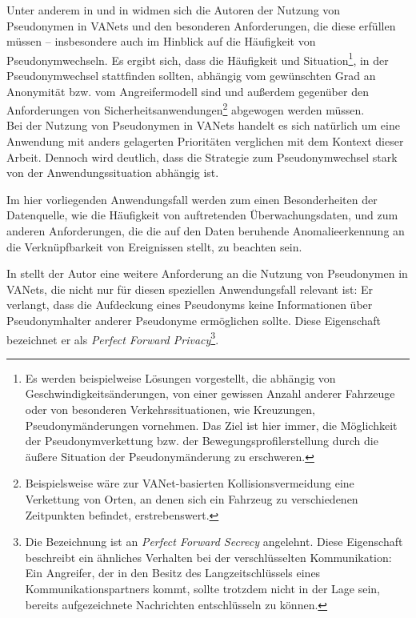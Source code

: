 Unter anderem in \cite{dotzer2005} und in \cite{petit2015} widmen sich die Autoren der Nutzung von Pseudonymen in VANets und den besonderen Anforderungen, die diese erfüllen müssen -- insbesondere auch im Hinblick auf die Häufigkeit von Pseudonymwechseln. Es ergibt sich, dass die Häufigkeit und Situation\footnote{
  Es werden beispielweise Lösungen vorgestellt, die abhängig von Geschwindigkeitsänderungen, von einer gewissen Anzahl anderer Fahrzeuge oder von besonderen Verkehrssituationen, wie Kreuzungen, Pseudonymänderungen vornehmen. Das Ziel ist hier immer, die Möglichkeit der Pseudonymverkettung bzw. der Bewegungsprofilerstellung durch die äußere Situation der Pseudonymänderung zu erschweren.
}, in der Pseudonymwechsel stattfinden sollten, abhängig vom gewünschten Grad an Anonymität bzw. vom Angreifermodell sind und außerdem gegenüber den Anforderungen von Sicherheitsanwendungen\footnote{
  Beispielsweise wäre zur VANet-basierten Kollisionsvermeidung eine Verkettung von Orten, an denen sich ein Fahrzeug zu verschiedenen Zeitpunkten befindet, erstrebenswert.
}  abgewogen werden müssen.\\
Bei der Nutzung von Pseudonymen in VANets handelt es sich natürlich um eine Anwendung mit anders gelagerten Prioritäten verglichen mit dem Kontext dieser Arbeit. Dennoch wird deutlich, dass die Strategie zum Pseudonymwechsel stark von der Anwendungssituation abhängig ist. 

Im hier vorliegenden Anwendungsfall werden zum einen Besonderheiten der Datenquelle, wie die Häufigkeit von auftretenden Überwachungsdaten, und zum anderen Anforderungen, die die auf den Daten beruhende Anomalieerkennung an die Verknüpfbarkeit von Ereignissen stellt, zu beachten sein. 


In \cite{schaub2009} stellt der Autor eine weitere Anforderung an die Nutzung von Pseudonymen in VANets, die nicht nur für diesen speziellen Anwendungsfall relevant ist: Er verlangt, dass die Aufdeckung eines Pseudonyms keine Informationen über Pseudonymhalter anderer Pseudonyme ermöglichen sollte. Diese Eigenschaft bezeichnet er als \textit{Perfect Forward Privacy}\footnote{
  Die Bezeichnung ist an \textit{Perfect Forward Secrecy} angelehnt. Diese Eigenschaft beschreibt ein ähnliches Verhalten bei der verschlüsselten Kommunikation: Ein Angreifer, der in den Besitz des Langzeitschlüssels eines Kommunikationspartners kommt, sollte trotzdem nicht in der Lage sein, bereits aufgezeichnete Nachrichten entschlüsseln zu können.
}.

